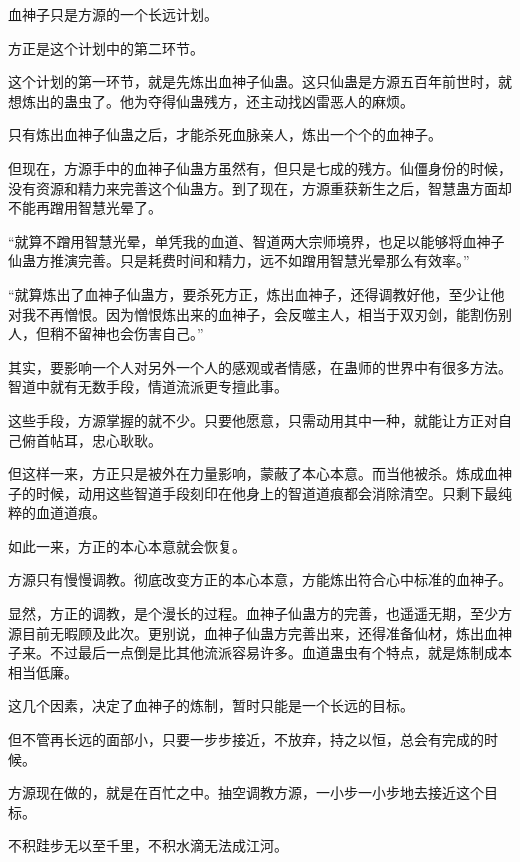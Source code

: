 
\begin{this_body}



血神子只是方源的一个长远计划。

方正是这个计划中的第二环节。

这个计划的第一环节，就是先炼出血神子仙蛊。这只仙蛊是方源五百年前世时，就想炼出的蛊虫了。他为夺得仙蛊残方，还主动找凶雷恶人的麻烦。

只有炼出血神子仙蛊之后，才能杀死血脉亲人，炼出一个个的血神子。

但现在，方源手中的血神子仙蛊方虽然有，但只是七成的残方。仙僵身份的时候，没有资源和精力来完善这个仙蛊方。到了现在，方源重获新生之后，智慧蛊方面却不能再蹭用智慧光晕了。

“就算不蹭用智慧光晕，单凭我的血道、智道两大宗师境界，也足以能够将血神子仙蛊方推演完善。只是耗费时间和精力，远不如蹭用智慧光晕那么有效率。”

“就算炼出了血神子仙蛊方，要杀死方正，炼出血神子，还得调教好他，至少让他对我不再憎恨。因为憎恨炼出来的血神子，会反噬主人，相当于双刃剑，能割伤别人，但稍不留神也会伤害自己。”

其实，要影响一个人对另外一个人的感观或者情感，在蛊师的世界中有很多方法。智道中就有无数手段，情道流派更专擅此事。

这些手段，方源掌握的就不少。只要他愿意，只需动用其中一种，就能让方正对自己俯首帖耳，忠心耿耿。

但这样一来，方正只是被外在力量影响，蒙蔽了本心本意。而当他被杀。炼成血神子的时候，动用这些智道手段刻印在他身上的智道道痕都会消除清空。只剩下最纯粹的血道道痕。

如此一来，方正的本心本意就会恢复。

方源只有慢慢调教。彻底改变方正的本心本意，方能炼出符合心中标准的血神子。

显然，方正的调教，是个漫长的过程。血神子仙蛊方的完善，也遥遥无期，至少方源目前无暇顾及此次。更别说，血神子仙蛊方完善出来，还得准备仙材，炼出血神子来。不过最后一点倒是比其他流派容易许多。血道蛊虫有个特点，就是炼制成本相当低廉。

这几个因素，决定了血神子的炼制，暂时只能是一个长远的目标。

但不管再长远的面部小，只要一步步接近，不放弃，持之以恒，总会有完成的时候。

方源现在做的，就是在百忙之中。抽空调教方源，一小步一小步地去接近这个目标。

不积跬步无以至千里，不积水滴无法成江河。


\end{this_body}

